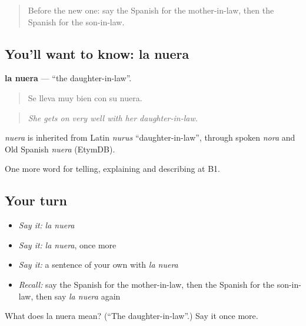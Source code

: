 \begin{quote}
Before the new one: say the Spanish for the mother-in-law, then the Spanish for the son-in-law.
\end{quote}

\subsection*{You'll want to know: la nuera}
\textbf{la nuera} — \textquotedblleft{}the daughter-in-law\textquotedblright{}.

\begin{quote}
Se lleva muy bien con su nuera.
\end{quote}

\begin{quote}
\emph{She gets on very well with her daughter-in-law.}
\end{quote}

\begin{cousinweb}
\emph{nuera} is inherited from Latin \emph{nurus} \textquotedblleft{}daughter-in-law\textquotedblright{}, through spoken \emph{nora} and Old Spanish \emph{nuera} (EtymDB).
\end{cousinweb}

\begin{grammarlens}[title={What you've built}]
One more word for telling, explaining and describing at B1.
\end{grammarlens}

\subsection*{Your turn}
\begin{itemize}
\raggedright
  \item \emph{Say it:} \emph{la nuera}
  \item \emph{Say it:} \emph{la nuera}, once more
  \item \emph{Say it:} a sentence of your own with \emph{la nuera}
  \item \emph{Recall:} say the Spanish for the mother-in-law, then the Spanish for the son-in-law, then say \emph{la nuera} again
\end{itemize}

\begin{tcolorbox}[breakable,colback=teal!4,colframe=teal!35!black,title={Before you move on}]
What does la nuera mean? (\textquotedblleft{}The daughter-in-law\textquotedblright{}.) Say it once more.
\end{tcolorbox}
